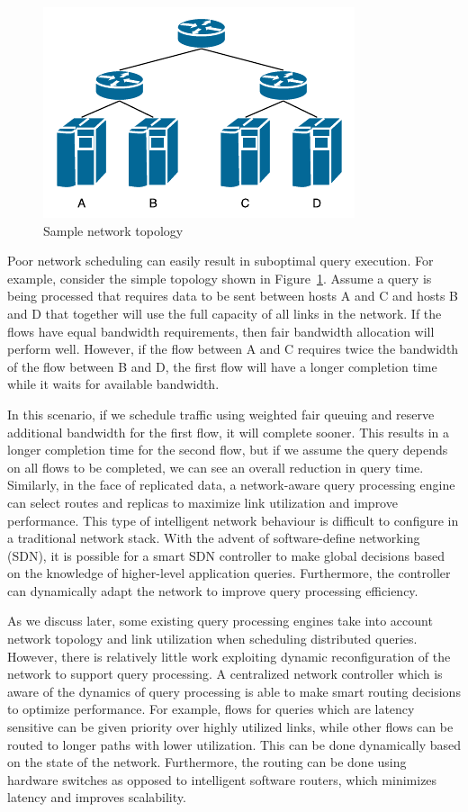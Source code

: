 \documentclass{sig-alternate-2013}
\begin{document}
\begin{figure}
    \centering
    \includegraphics{figures/sample-topology.pdf}
    \caption{Sample network topology}\label{fig:sample-topology}
\end{figure}

Poor network scheduling can easily result in suboptimal query execution.
For example, consider the simple topology shown in Figure~\ref{fig:sample-topology}.
Assume a query is being processed that requires data to be sent between hosts A and C and hosts B and D that together will use the full capacity of all links in the network.
If the flows have equal bandwidth requirements, then fair bandwidth allocation will perform well.
However, if the flow between A and C requires twice the bandwidth of the flow between B and D, the first flow will have a longer completion time while it waits for available bandwidth.

In this scenario, if we schedule traffic using weighted fair queuing and reserve additional bandwidth for the first flow, it will complete sooner.
This results in a longer completion time for the second flow, but if we assume the query depends on all flows to be completed, we can see an overall reduction in query time.
Similarly, in the face of replicated data, a network-aware query processing engine can select routes and replicas to maximize link utilization and improve performance.
This type of intelligent network behaviour is difficult to configure in a traditional network stack.
With the advent of software-define networking (SDN), it is possible for a smart SDN controller to make global decisions based on the knowledge of higher-level application queries.
Furthermore, the controller can dynamically adapt the network to improve query processing efficiency.

As we discuss later, some existing query processing engines take into account network topology and link utilization when scheduling distributed queries.
However, there is relatively little work exploiting dynamic reconfiguration of the network to support query processing.
A centralized network controller which is aware of the dynamics of query processing is able to make smart routing decisions to optimize performance.
For example, flows for queries which are latency sensitive can be given priority over highly utilized links, while other flows can be routed to longer paths with lower utilization.
This can be done dynamically based on the state of the network.
Furthermore, the routing can be done using hardware switches as opposed to intelligent software routers, which minimizes latency and improves scalability.
\end{document}

